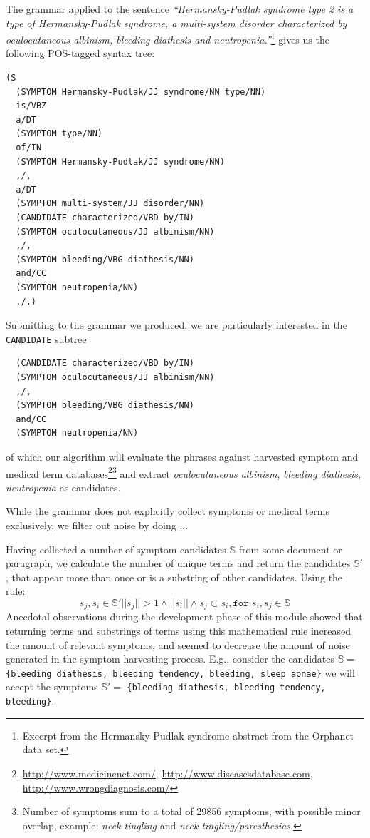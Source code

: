 \documentclass[10pt,letterpaper,final]{article}
\begin{document}
The grammar applied to the sentence \textit{``Hermansky-Pudlak syndrome
type 2 is a type of Hermansky-Pudlak syndrome, a multi-system disorder characterized by oculocutaneous albinism,
bleeding diathesis and neutropenia.''}\footnote{Excerpt from the
Hermansky-Pudlak syndrome abstract from the Orphanet data set.} gives us
the following POS-tagged syntax tree:
\begin{lstlisting}
(S
  (SYMPTOM Hermansky-Pudlak/JJ syndrome/NN type/NN)
  is/VBZ
  a/DT
  (SYMPTOM type/NN)
  of/IN
  (SYMPTOM Hermansky-Pudlak/JJ syndrome/NN)
  ,/,
  a/DT
  (SYMPTOM multi-system/JJ disorder/NN)
  (CANDIDATE characterized/VBD by/IN)
  (SYMPTOM oculocutaneous/JJ albinism/NN)
  ,/,
  (SYMPTOM bleeding/VBG diathesis/NN)
  and/CC
  (SYMPTOM neutropenia/NN)
  ./.)
\end{lstlisting}
Submitting to the grammar we produced, we are particularly interested in
the \texttt{CANDIDATE} subtree
\begin{lstlisting}
  (CANDIDATE characterized/VBD by/IN)
  (SYMPTOM oculocutaneous/JJ albinism/NN)
  ,/,
  (SYMPTOM bleeding/VBG diathesis/NN)
  and/CC
  (SYMPTOM neutropenia/NN)
\end{lstlisting}
of which our algorithm will evaluate the phrases against harvested
symptom and medical term
databases\footnote{\url{http://www.medicinenet.com/},
\url{http://www.diseasesdatabase.com},
\url{http://www.wrongdiagnosis.com/}}\footnote{Number of symptoms sum to
a total of 29856 symptoms, with possible minor overlap, example:
\textit{neck tingling} and \textit{neck tingling/paresthesias}.} and extract
\textit{oculocutaneous albinism}, \textit{bleeding diathesis},
\textit{neutropenia} as candidates.

While the grammar does not explicitly collect symptoms or medical terms
exclusively, we filter out noise by doing ...


Having collected a number of symptom candidates $\mathbb{S}$ from some
document or paragraph, we calculate the number of unique terms and return
the candidates $\mathbb{S'}$, that appear more than once or is a
substring of other candidates.  Using the rule:
\begin{equation}
 s_{j}, s_{i} \in \mathbb{S'} ||s_{j}|| > 1 \wedge||s_{i}|| \wedge s_{j} \subset s_{i}, \texttt{for } s_{i}, s_{j} \in \mathbb{S}
\end{equation}
Anecdotal observations during the development phase of this module
showed that returning terms and substrings of terms using this
mathematical rule increased the amount of relevant symptoms, and seemed
to decrease the amount of noise generated in the symptom harvesting
process. E.g., consider the candidates $\mathbb{S} = $
\texttt{\{bleeding diathesis, bleeding tendency, bleeding, sleep
apnae\}} we will accept the symptoms $\mathbb{S'} = $ \texttt{\{bleeding
diathesis, bleeding tendency, bleeding\}}.
\end{document}
